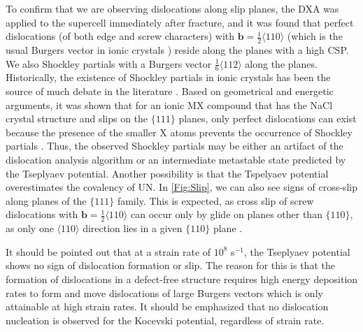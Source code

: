 \documentclass[applsci,article,submit,pdftex,moreauthors]{Definitions/mdpi}
\newcommand{\?}{\stackrel{?}{=}}
\providecommand{\DIFadd}[1]{{\bf #1}} %
\providecommand{\DIFdel}[1]{} %
\providecommand{\DIFaddbegin}{\protect\color{blue}} %
\providecommand{\DIFaddend}{\protect\color{black}} %
\providecommand{\DIFdelbegin}{\protect\color{red}} %
\providecommand{\DIFdelend}{\protect\color{black}} %
\newcommand{\DIFscaledelfig}{0.5}
\newlength{\DIFdelgraphicswidth} %
\newlength{\DIFdelgraphicsheight} %
\newcommand{\DIFaddincludegraphics}[2][]{{\color{blue}\fbox{\DIFOincludegraphics[#1]{#2}}}} %
\newcommand{\DIFdelincludegraphics}[2][]{%
\sbox{\DIFdelgraphicsbox}{\DIFOincludegraphics[#1]{#2}}%
\settoboxwidth{\DIFdelgraphicswidth}{\DIFdelgraphicsbox} %
\settoboxtotalheight{\DIFdelgraphicsheight}{\DIFdelgraphicsbox} %
\scalebox{\DIFscaledelfig}{%
\parbox[b]{\DIFdelgraphicswidth}{\usebox{\DIFdelgraphicsbox}\\[-\baselineskip] \rule{\DIFdelgraphicswidth}{0em}}\llap{\resizebox{\DIFdelgraphicswidth}{\DIFdelgraphicsheight}{%
\setlength{\unitlength}{\DIFdelgraphicswidth}%
\begin{picture}(1,1)%
\thicklines\linethickness{2pt} %
{\color[rgb]{1,0,0}\put(0,0){\framebox(1,1){}}}%
{\color[rgb]{1,0,0}\put(0,0){\line( 1,1){1}}}%
{\color[rgb]{1,0,0}\put(0,1){\line(1,-1){1}}}%
\end{picture}%
}\hspace*{3pt}}} %
} %
\DeclareRobustCommand{\DIFaddbegin}{\DIFOaddbegin \let\includegraphics\DIFaddincludegraphics} %
\DeclareRobustCommand{\DIFaddend}{\DIFOaddend \let\includegraphics\DIFOincludegraphics} %
\DeclareRobustCommand{\DIFdelbegin}{\DIFOdelbegin \let\includegraphics\DIFdelincludegraphics} %
\DeclareRobustCommand{\DIFdelend}{\DIFOaddend \let\includegraphics\DIFOincludegraphics} %
\begin{document}
To confirm that we are observing dislocations along slip planes, the DXA \DIFdelbegin \DIFdel{algorithm }\DIFdelend was applied to the supercell immediately after fracture, and it was found that perfect dislocations (of both edge and screw characters) with $\mathbf{b} = \frac{1}{2} \langle 110 \rangle$ (which is the usual Burgers vector in ionic crystals \cite{Hull2011}) reside along the planes with a high CSP. We also \DIFdelbegin \DIFdel{found many }\DIFdelend \DIFaddbegin \DIFadd{observed several }\DIFaddend Shockley partials with a Burgers vector $\frac{1}{6}\langle112\rangle$ along the \DIFdelbegin \DIFdel{same }\DIFdelend \DIFaddbegin \DIFadd{slip }\DIFaddend planes. Historically, the existence of Shockley partials in ionic crystals has been the source of much debate in the literature \cite{Smoluchowski1966, Haasen1985}. Based on geometrical and energetic arguments, it was shown that for an ionic MX compound that has the NaCl crystal structure and slips on the $\{111\}$ planes, only perfect dislocations can exist because the presence of the smaller X atoms prevents the occurrence of Shockley partials \cite{VanDerWalt1967}. Thus, the observed Shockley partials may be either an artifact of the dislocation analysis algorithm or an intermediate metastable state predicted by the Tseplyaev potential. Another possibility is that the Tspelyaev potential overestimates the covalency of UN. In \cref{Fig:Slip}, we can also see signs of cross-slip along planes of the $\{111\}$ family. This is expected, as cross slip of screw dislocations with $\mathbf{b} = \frac{1}{2}\langle110\rangle$ can occur only by glide on planes other than $\{110\}$, as only one $\langle110\rangle$ direction lies in a given $\{110\}$ plane \cite{Hull2011}.

It should be pointed out that at a strain rate of $10^{8}$ s$^{-1}$, the Tseplyaev potential shows no sign of dislocation formation or slip. The reason for this is that the formation of dislocations in a defect-free structure requires high energy deposition rates to form and move dislocations of large Burgers vectors \cite{Desai2008, Pal2020} which is only attainable at high strain rates. It should be emphasized that no dislocation nucleation is observed for the Kocevski potential, regardless of strain rate.
\end{document}
